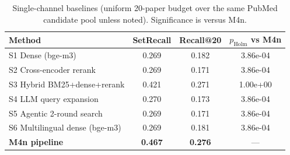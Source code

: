 \begin{table}[h]
\centering\small
\caption{Single-channel baselines (uniform 20-paper budget over the same PubMed candidate pool unless noted). Significance is versus M4n.}
\label{tab:supp-sota}
\begin{tabular}{lccc}
\toprule
Method & SetRecall & Recall@20 & $p_{\mathrm{Holm}}$ vs M4n \\
\midrule
S1 Dense (bge-m3) & 0.269 & 0.182 & 3.86e-04 \\
S2 Cross-encoder rerank & 0.269 & 0.171 & 3.86e-04 \\
S3 Hybrid BM25+dense+rerank & 0.421 & 0.271 & 1.00e+00 \\
S4 LLM query expansion & 0.270 & 0.173 & 3.86e-04 \\
S5 Agentic 2-round search & 0.269 & 0.171 & 3.86e-04 \\
S6 Multilingual dense (bge-m3) & 0.269 & 0.181 & 3.86e-04 \\
\midrule
\textbf{M4n pipeline} & \textbf{0.467} & \textbf{0.276} & --- \\
\bottomrule
\end{tabular}
\end{table}
